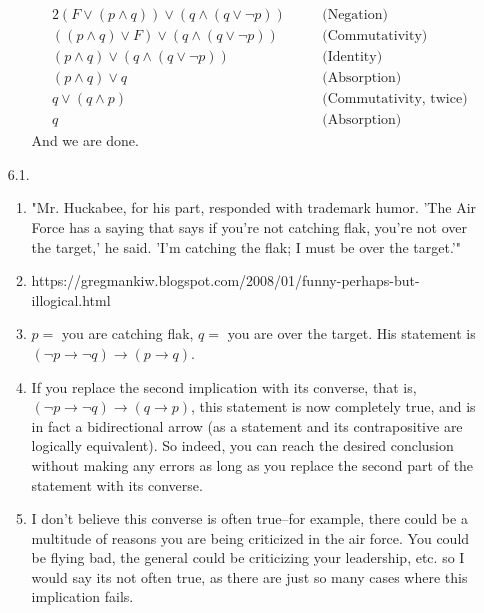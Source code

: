 \documentclass[12pt]{article}
\theoremstyle{definition}
\theoremstyle{remark}
\newcommand{\justif}[1]{&\quad &\text{(#1)}}
\newcommand{\ra}{\rightarrow}
\begin{document}
\begin{enumerate}[leftmargin=\labelsep]
\begin{enumerate}
\begin{alignat*}{2}
				(F \lor (p \land q)) \lor (q \land (q \lor \lnot p)) \justif{Negation} \\
				((p \land q) \lor F) \lor (q \land (q \lor \lnot p)) \justif{Commutativity} \\
				(p \land q) \lor (q \land (q \lor \lnot p)) \justif{Identity} \\
				(p \land q) \lor q \justif{Absorption} \\ 
				q \lor (q \land p) \justif{Commutativity, twice} \\
				q \justif{Absorption}
			\end{alignat*}
			And we are done.
		\end{enumerate}
		
		\newpage
		\item[6.1.]
		\begin{enumerate}
			\item "Mr. Huckabee, for his part, responded with trademark humor. 'The Air Force has a saying that says if you’re not catching flak, you’re not over the target,' he said. 'I’m catching the flak; I must be over the target.'"
			\item https://gregmankiw.blogspot.com/2008/01/funny-perhaps-but-illogical.html
			\item $p = $ you are catching flak, $q = $ you are over the target. His statement is $(\lnot p \ra \lnot q) \ra (p \ra q)$.
			\item If you replace the second implication with its converse, that is, $(\lnot p \ra \lnot q) \ra (q \ra p)$, this statement is now completely true, and is in fact a bidirectional arrow (as a statement and its contrapositive are logically equivalent). So indeed, you can reach the desired conclusion without making any errors as long as you replace the second part of the statement with its converse.
			\item I don't believe this converse is often true--for example, there could be a multitude of reasons you are being criticized in the air force. You could be flying bad, the general could be criticizing your leadership, etc. so I would say its not often true, as there are just so many cases where this implication fails.
		\end{enumerate}
		

\end{enumerate}
\end{document}
